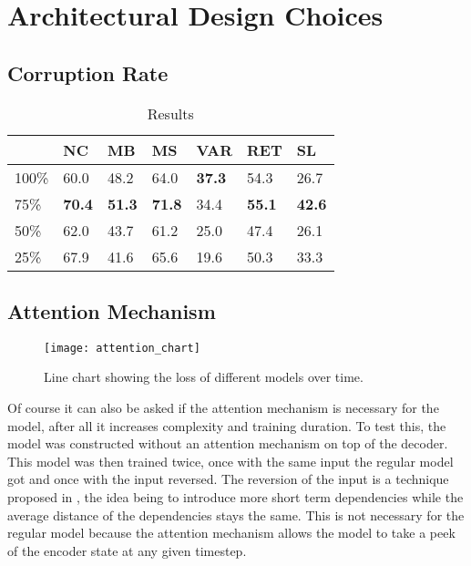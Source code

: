 \section{Architectural Design Choices}

\subsection{Corruption Rate}

\begin{table}[h]
\begin{tabular}{ | m{2cm} | m{1cm} | m{1cm} | m{1cm} | m{1cm} | m{1cm} | m{1cm} | }
  \hline
  & NC & MB & MS & VAR & RET & SL \\
  \hline
  \hline
  100\% & 60.0 & 48.2 & 64.0 & \textbf{37.3} & 54.3 & 26.7 \\
  \hline
  75\% & \textbf{70.4} & \textbf{51.3} & \textbf{71.8} & 34.4 & \textbf{55.1} & \textbf{42.6} \\
  \hline
  50\% & 62.0 & 43.7 & 61.2 & 25.0 & 47.4 & 26.1 \\
  \hline
  25\% & 67.9 & 41.6 & 65.6 & 19.6 & 50.3 & 33.3 \\
  \hline
\end{tabular}
\caption{Results}
\label{corruption_rate_table}
\end{table}

\subsection{Attention Mechanism}

\begin{figure}[p]
\centering
\texttt{[image: attention\_chart]}
\caption{Line chart showing the loss of different models over time.}
\label{attention_chart}
\end{figure}


Of course it can also be asked if the attention mechanism is necessary for the model, after all it increases complexity and training duration. To test this, the model was constructed without an attention mechanism on top of the decoder. This model was then trained twice, once with the same input the regular model got and once with the input reversed. The reversion of the input is a technique proposed in \cite{seq2seq}, the idea being to introduce more short term dependencies while the average distance of the dependencies stays the same. This is not necessary for the regular model because the attention mechanism allows the model to take a peek of the encoder state at any given timestep.


